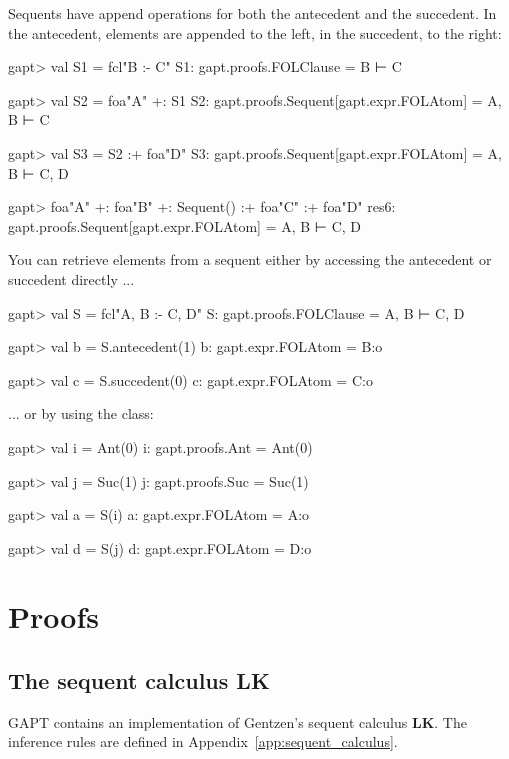 \documentclass[a4paper,11pt]{book}
\newcommand{\LK}{\textbf{LK}}
\newcommand{\cli}[1]{{\ttfamily {#1}}}
\begin{document}
Sequents have append operations for both the antecedent and the succedent. In the antecedent,
elements are appended to the left, in the succedent, to the right:

\begin{clilisting}
gapt> val S1 = fcl"B :- C"
S1: gapt.proofs.FOLClause = B ⊢ C

gapt> val S2 = foa"A" +: S1
S2: gapt.proofs.Sequent[gapt.expr.FOLAtom] = A, B ⊢ C

gapt> val S3 = S2 :+ foa"D"
S3: gapt.proofs.Sequent[gapt.expr.FOLAtom] = A, B ⊢ C, D

gapt> foa"A" +: foa"B" +: Sequent() :+ foa"C" :+ foa"D"
res6: gapt.proofs.Sequent[gapt.expr.FOLAtom] = A, B ⊢ C, D

\end{clilisting}

You can retrieve elements from a sequent either by accessing the antecedent
or succedent directly ...
\begin{clilisting}
gapt> val S = fcl"A, B :- C, D"
S: gapt.proofs.FOLClause = A, B ⊢ C, D

gapt> val b = S.antecedent(1)
b: gapt.expr.FOLAtom = B:o

gapt> val c = S.succedent(0)
c: gapt.expr.FOLAtom = C:o

\end{clilisting}
... or by using the \cli{SequentIndex} class:

\begin{clilisting}
gapt> val i = Ant(0)
i: gapt.proofs.Ant = Ant(0)

gapt> val j = Suc(1)
j: gapt.proofs.Suc = Suc(1)

gapt> val a = S(i)
a: gapt.expr.FOLAtom = A:o

gapt> val d = S(j)
d: gapt.expr.FOLAtom = D:o

\end{clilisting}


\section{Proofs}\label{sec:entering_proofs}

\subsection{The sequent calculus LK}
GAPT contains an implementation of Gentzen's sequent calculus {\LK}.
The inference rules are defined in Appendix~\ref{app:sequent_calculus}.
\end{document}
